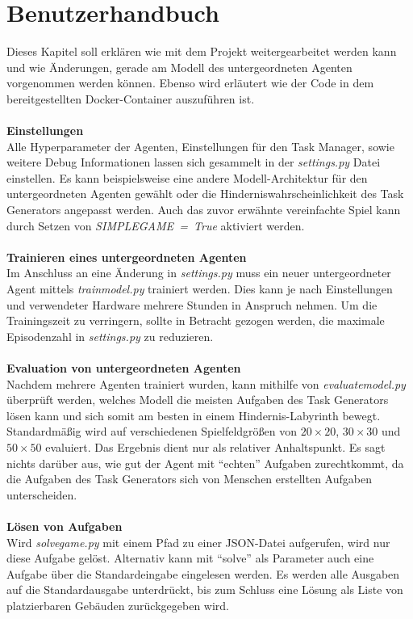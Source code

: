 \section{Benutzerhandbuch}\label{cap:benutzerhandbuch}
Dieses Kapitel soll erklären wie mit dem Projekt weitergearbeitet werden kann und wie Änderungen, gerade am Modell des untergeordneten Agenten vorgenommen werden können. Ebenso wird erläutert wie der Code in dem bereitgestellten Docker-Container auszuführen ist.
\\\\
\textbf{Einstellungen}\\
Alle Hyperparameter der Agenten, Einstellungen für den Task Manager, sowie weitere Debug Informationen lassen sich gesammelt in der \textit{settings.py} Datei einstellen. 
Es kann beispielsweise eine andere Modell-Architektur für den untergeordneten Agenten gewählt oder die Hinderniswahrscheinlichkeit des Task Generators angepasst werden. Auch das zuvor erwähnte vereinfachte Spiel kann durch Setzen von \textit{\mbox{SIMPLE\textunderscore{}GAME = True}}
aktiviert werden. 
\\\\
\textbf{Trainieren eines untergeordneten Agenten}\\
Im Anschluss an eine Änderung in \textit{settings.py} muss ein neuer untergeordneter Agent mittels \textit{train\textunderscore{}model.py} trainiert werden. Dies kann je nach Einstellungen und verwendeter Hardware mehrere Stunden in Anspruch nehmen. Um die Trainingszeit zu verringern, sollte in Betracht gezogen werden, die maximale Episodenzahl in \textit{\mbox{settings.py}} zu reduzieren.
\\\\
\textbf{Evaluation von untergeordneten Agenten}\\
Nachdem mehrere Agenten trainiert wurden, kann mithilfe von \textit{evaluate\textunderscore{}model.py} überprüft werden, welches Modell die meisten Aufgaben des Task Generators lösen kann und sich somit am besten in einem Hindernis-Labyrinth bewegt. Standardmäßig wird auf verschiedenen Spielfeldgrößen von $20\times20$, $30\times30$ und $50\times50$ evaluiert.
Das Ergebnis dient nur als relativer Anhaltspunkt. Es sagt nichts darüber aus, wie gut der Agent mit “echten” Aufgaben zurechtkommt, da die Aufgaben des Task Generators sich von Menschen erstellten Aufgaben unterscheiden. 
\\\\
\textbf{Lösen von Aufgaben}\\
Wird \textit{solve\textunderscore{}game.py} mit einem Pfad zu einer JSON-Datei aufgerufen, wird nur diese Aufgabe gelöst. Alternativ kann mit “solve” als Parameter auch eine Aufgabe über die Standardeingabe eingelesen werden. Es werden alle Ausgaben auf die Standardausgabe unterdrückt, bis zum Schluss eine Lösung als Liste von platzierbaren Gebäuden zurückgegeben wird. 
